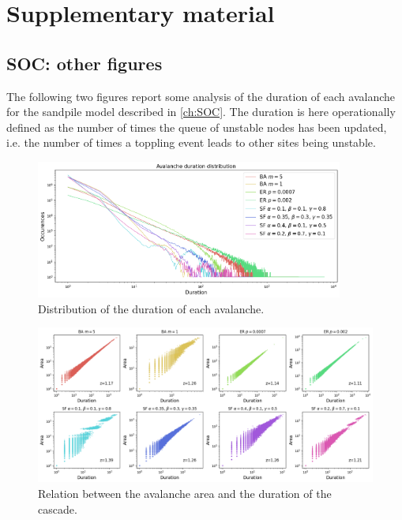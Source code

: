 \chapter{Supplementary material}
\vspace{-1cm}

\section{SOC: other figures}
\label{ch:SM_SOC}
The following two figures report some analysis of the duration of each avalanche for the sandpile model described in \ref{ch:SOC}. The duration is here operationally defined as the number of times the queue of unstable nodes has been updated, i.e. the number of times a toppling event leads to other sites being unstable. 
\begin{figure}[h] 
    \centering
    \includegraphics[width=0.9\textwidth]{images/task15/d_dist2.png} 
    \vspace{-0.5cm}
    \caption{Distribution of the duration of each avalanche.}
    \label{fig:adist} 
\end{figure}

\begin{figure}[h] 
    \centering
    \includegraphics[width=1\textwidth]{images/task15/at.png} 
    \vspace{-0.5cm}
    \caption{Relation between the avalanche area and the duration of the cascade.}
    \label{fig:adist} 
\end{figure}

